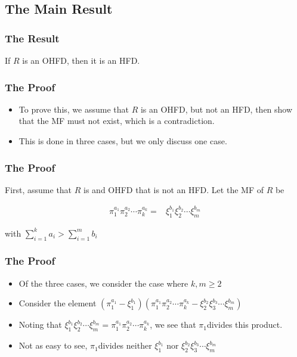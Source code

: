 \subsection{The Main Result}
\begin{frame}

	\frametitle{The Result}
	\begin{theorem}
	If $R$ is an OHFD, then it is an HFD.
	\end{theorem}
\end{frame}

\begin{frame}
  \frametitle{The Proof}
  \begin{itemize}
    \item To prove this, we assume that $R$ is an OHFD, but not an HFD, then show that the MF must not exist, which is a contradiction.
    \item This is done in three cases, but we only discuss one case.
  \end{itemize}
\end{frame}

\begin{frame}
  \frametitle{The Proof}

  First, assume that $R$ is and OHFD that is not an HFD. Let the MF of $R$ be 

  \begin{align*}
    \pi_{1}^{a_{1}}\pi_{2}^{a_{2}}\cdots\pi_{k}^{a_{k}}= & \xi_{1}^{b_{1}}\xi_{2}^{b_{2}}\cdots\xi_{m}^{b_{m}}
  \end{align*}

  with $\sum_{i=1}^{k}a_{i}>\sum_{i=1}^{m}b_{i}$
\end{frame}

\begin{frame}
  \frametitle{The Proof}
  \begin{itemize}
    \item Of the three cases, we consider the case where $k,m \geq 2$
  \end{itemize}

  \pause{}
  \begin{itemize}
    \item Consider the element $(\pi_{1}^{a_{1}}-\xi_{1}^{b_{1}})(\pi_{1}^{a_{1}}\pi_{2}^{a_{2}}\cdots\pi_{k}^{a_{k}}-\xi_{2}^{b_{2}}\xi_{3}^{b_{3}}\cdots\xi_{m}^{b_{m}})$
  \end{itemize}

  \pause{}
  \begin{itemize}
    \item Noting that $\xi_{1}^{b_{1}}\xi_{2}^{b_{2}}\cdots\xi_{m}^{b_{m}}=\pi_{1}^{a_{1}}\pi_{2}^{a_{2}}\cdots\pi_{k}^{a_{k}}$, we see that $\pi_{1}$divides this product. 
  \end{itemize}

  \pause{}
  \begin{itemize}
    \item Not as easy to see, $\pi_{1}$divides neither $\xi_{1}^{b_{1}}$ nor
      $\xi_{2}^{b_{2}}\xi_{3}^{b_{3}}\cdots\xi_{m}^{b_{m}}$
  \end{itemize}
\end{frame}

